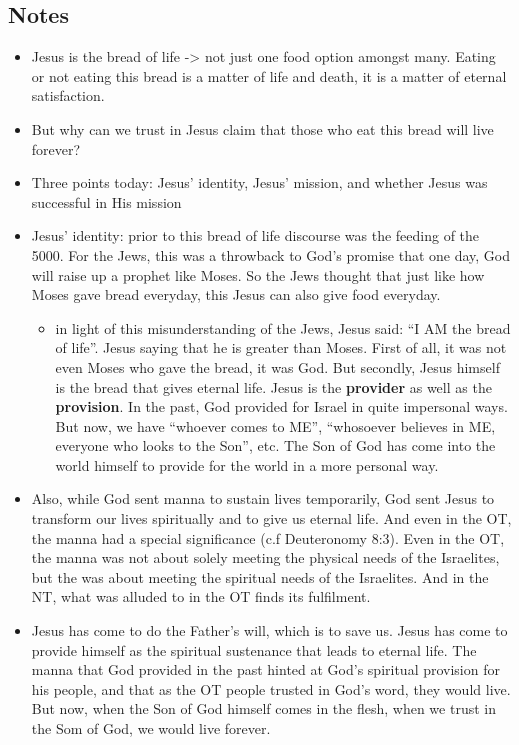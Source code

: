 \subsection*{Notes}
\begin{itemize}
  \item{Jesus is the bread of life -> not just one food option amongst many. Eating or not eating this bread is a matter of life and death, it is a matter of eternal satisfaction. }
  \item{But why can we trust in Jesus claim that those who eat this bread will live forever?}
  \item{Three points today: Jesus’ identity, Jesus’ mission, and whether Jesus was successful in His mission}
  \item{Jesus’ identity: prior to this bread of life discourse was the feeding of the 5000. For the Jews, this was a throwback to God’s promise that one day, God will raise up a prophet like Moses. So the Jews thought that just like how Moses gave bread everyday, this Jesus can also give food everyday.
  \begin{itemize}
    \item{in light of this misunderstanding of the Jews, Jesus said: “I AM the bread of life”. Jesus saying that he is greater than Moses. First of all, it was not even Moses who gave the bread, it was God. But secondly, Jesus himself is the bread that gives eternal life. Jesus is the \textbf{provider} as well as the \textbf{provision}. In the past, God provided for Israel in quite impersonal ways. But now, we have “whoever comes to ME”, “whosoever believes in ME, everyone who looks to the Son”, etc. The Son of God has come into the world himself to provide for the world in a more personal way. }
  \end{itemize}}
  \item{Also, while God sent manna to sustain lives temporarily, God sent Jesus to transform our lives spiritually and to give us eternal life. And even in the OT, the manna had a special significance (c.f Deuteronomy 8:3). Even in the OT, the manna was not about solely meeting the physical needs of the Israelites, but the was about meeting the spiritual needs of the Israelites. And in the NT, what was alluded to in the OT finds its fulfilment. }
  \item{Jesus has come to do the Father’s will, which is to save us. Jesus has come to provide himself as the spiritual sustenance that leads to eternal life. The manna that God provided in the past hinted at God’s spiritual provision for his people, and that as the OT people trusted in God’s word, they would live. But now, when the Son of God himself comes in the flesh, when we trust in the Som of God, we would live forever.}

\end{itemize}
